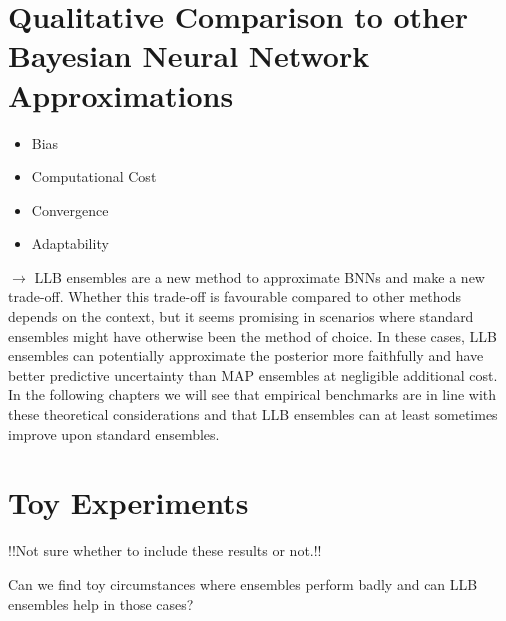 \documentclass[../thesis.tex]{subfiles}
\begin{document}
\section{Qualitative Comparison to other Bayesian Neural Network Approximations}
\begin{itemize}
    \item Bias
    \item Computational Cost
    \item Convergence
    \item Adaptability
\end{itemize}
$\rightarrow$ LLB ensembles are a new method to approximate BNNs and make a new trade-off. Whether this trade-off is favourable compared to other methods depends on the context, but it seems promising in scenarios where standard ensembles might have otherwise been the method of choice. In these cases, LLB ensembles can potentially approximate the posterior more faithfully and have better predictive uncertainty than MAP ensembles at negligible additional cost. In the following chapters we will see that empirical benchmarks are in line with these theoretical considerations and that LLB ensembles can at least sometimes improve upon standard ensembles.


\section{Toy Experiments}
!!Not sure whether to include these results or not.!!

Can we find toy circumstances where ensembles perform badly and can LLB ensembles help in those cases?
\end{document}
